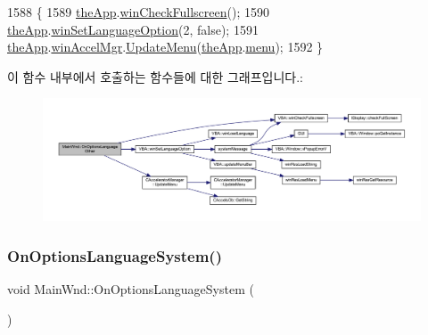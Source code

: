 \begin{DoxyCode}
1588 \{
1589   \mbox{\hyperlink{_v_b_a_8cpp_a8095a9d06b37a7efe3723f3218ad8fb3}{theApp}}.\mbox{\hyperlink{class_v_b_a_a340eaeeb7fcfc242f08ac3442d991a96}{winCheckFullscreen}}();
1590   \mbox{\hyperlink{_v_b_a_8cpp_a8095a9d06b37a7efe3723f3218ad8fb3}{theApp}}.\mbox{\hyperlink{class_v_b_a_ae872998a3ecf3ec0d504378744f441e6}{winSetLanguageOption}}(2, \textcolor{keyword}{false});
1591   \mbox{\hyperlink{_v_b_a_8cpp_a8095a9d06b37a7efe3723f3218ad8fb3}{theApp}}.\mbox{\hyperlink{class_v_b_a_ad7ebce057dbde0ca88cee75e84721a89}{winAccelMgr}}.\mbox{\hyperlink{class_c_accelerator_manager_ac7411d20f413ea0ec3bd65705b564adf}{UpdateMenu}}(\mbox{\hyperlink{_v_b_a_8cpp_a8095a9d06b37a7efe3723f3218ad8fb3}{theApp}}.\mbox{\hyperlink{class_v_b_a_acf9d855b5b959a2df9c6cb21b888366e}{menu}});
1592 \}
\end{DoxyCode}
이 함수 내부에서 호출하는 함수들에 대한 그래프입니다.\+:
\nopagebreak
\begin{figure}[H]
\begin{center}
\leavevmode
\includegraphics[width=350pt]{class_main_wnd_a49362710ce41db0c6afc8e8bf529ea4d_cgraph}
\end{center}
\end{figure}
\mbox{\label{class_main_wnd_a9e8eaf3488f32697f695789cb89a7dce}} 
\subsubsection{\texorpdfstring{On\+Options\+Language\+System()}{OnOptionsLanguageSystem()}}
{\footnotesize\ttfamily void Main\+Wnd\+::\+On\+Options\+Language\+System (\begin{DoxyParamCaption}{ }\end{DoxyParamCaption})\hspace{0.3cm}{\ttfamily [protected]}}



